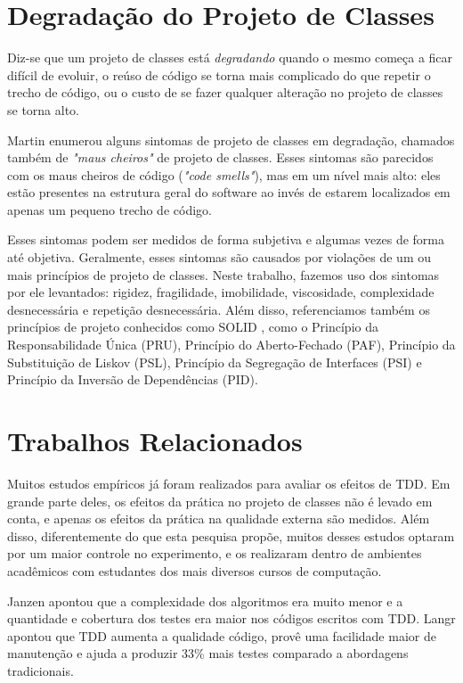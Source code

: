 \documentclass[conference]{IEEEtran}
\begin{document}
\section{Degradação do Projeto de Classes}

Diz-se que um projeto de classes está \textit{degradando}
quando o mesmo começa a ficar difícil de evoluir, o reúso de código se 
torna mais complicado do que repetir o trecho de código, ou o custo de se fazer 
qualquer alteração no projeto de classes se torna alto.

Martin \cite{bob-martin} enumerou alguns sintomas de projeto de classes em degradação, 
chamados também de \textit{"maus cheiros"} de projeto de classes. Esses sintomas são parecidos com os 
maus cheiros de código (\textit{"code smells"}), mas em um nível mais alto: eles
estão presentes na estrutura geral do software ao invés de estarem localizados
em apenas um pequeno trecho de código.

Esses sintomas podem ser medidos de forma subjetiva e algumas vezes de forma 
até objetiva. Geralmente, esses sintomas são causados por violações de um ou 
mais princípios de projeto de classes.
Neste trabalho, fazemos uso dos sintomas por ele levantados: rigidez, fragilidade, imobilidade, 
viscosidade, complexidade desnecessária e repetição desnecessária. Além disso, referenciamos também
os princípios de projeto conhecidos como SOLID \cite{bob-martin}, 
como o Princípio da Responsabilidade Única (PRU), Princípio do Aberto-Fechado (PAF),
Princípio da Substituição de Liskov (PSL), Princípio da Segregação de Interfaces (PSI) e Princípio da
Inversão de Dependências (PID).

\section{Trabalhos Relacionados}
\label{cap:trabalhos-relacionados}

Muitos estudos empíricos já foram realizados para avaliar os efeitos de TDD.
Em grande parte deles, os efeitos da prática no projeto de classes não é 
levado em conta, e apenas os efeitos da prática na qualidade externa são medidos.
Além disso, diferentemente
do que esta pesquisa propõe, muitos desses estudos optaram por um
maior controle no experimento, e os realizaram dentro de ambientes acadêmicos 
com estudantes dos mais diversos cursos de computação.

Janzen \cite{janzen-arch-improvement} 
apontou que a complexidade dos algoritmos era muito menor e a quantidade e
cobertura dos testes era maior nos códigos escritos com TDD.
Langr \cite{langr} apontou que TDD aumenta a qualidade código, provê uma 
facilidade maior de manutenção e ajuda a produzir 33\% mais testes comparado a
abordagens tradicionais.
\end{document}
